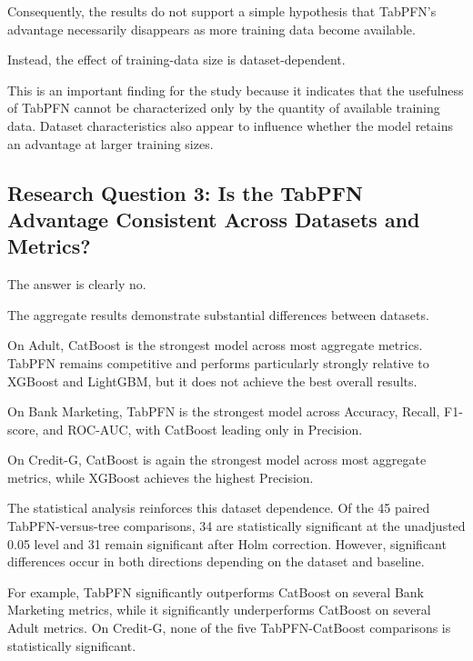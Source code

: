 Consequently, the results do not support a simple hypothesis that TabPFN's advantage necessarily disappears as more training data become available.



Instead, the effect of training-data size is dataset-dependent.



This is an important finding for the study because it indicates that the usefulness of TabPFN cannot be characterized only by the quantity of available training data. Dataset characteristics also appear to influence whether the model retains an advantage at larger training sizes.



\subsection{Research Question 3: Is the TabPFN Advantage Consistent Across Datasets and Metrics?}



The answer is clearly no.



The aggregate results demonstrate substantial differences between datasets.



On Adult, CatBoost is the strongest model across most aggregate metrics. TabPFN remains competitive and performs particularly strongly relative to XGBoost and LightGBM, but it does not achieve the best overall results.



On Bank Marketing, TabPFN is the strongest model across Accuracy, Recall, F1-score, and ROC-AUC, with CatBoost leading only in Precision.



On Credit-G, CatBoost is again the strongest model across most aggregate metrics, while XGBoost achieves the highest Precision.



The statistical analysis reinforces this dataset dependence. Of the 45 paired TabPFN-versus-tree comparisons, 34 are statistically significant at the unadjusted 0.05 level and 31 remain significant after Holm correction. However, significant differences occur in both directions depending on the dataset and baseline.



For example, TabPFN significantly outperforms CatBoost on several Bank Marketing metrics, while it significantly underperforms CatBoost on several Adult metrics. On Credit-G, none of the five TabPFN-CatBoost comparisons is statistically significant.



